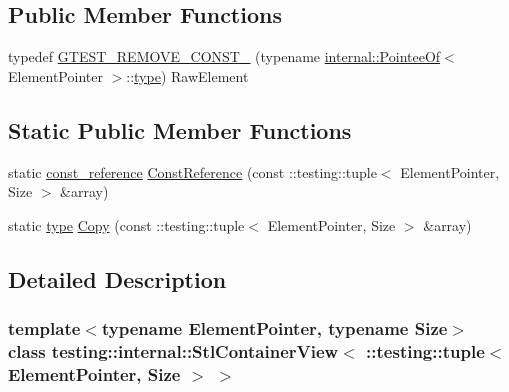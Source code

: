 \subsection*{Public Member Functions}
\begin{DoxyCompactItemize}
\item 
typedef \hyperlink{classtesting_1_1internal_1_1StlContainerView_3_01_1_1testing_1_1tuple_3_01ElementPointer_00_01Size_01_4_01_4_a2b1dd06842cb431ef647b85707ce52ff}{G\+T\+E\+S\+T\+\_\+\+R\+E\+M\+O\+V\+E\+\_\+\+C\+O\+N\+S\+T\+\_\+} (typename \hyperlink{structtesting_1_1internal_1_1PointeeOf}{internal\+::\+Pointee\+Of}$<$ Element\+Pointer $>$\+::\hyperlink{classtesting_1_1internal_1_1StlContainerView_3_01_1_1testing_1_1tuple_3_01ElementPointer_00_01Size_01_4_01_4_aedefb897170f76518afbca6f87b5467c}{type}) Raw\+Element
\end{DoxyCompactItemize}
\subsection*{Static Public Member Functions}
\begin{DoxyCompactItemize}
\item 
static \hyperlink{classtesting_1_1internal_1_1StlContainerView_3_01_1_1testing_1_1tuple_3_01ElementPointer_00_01Size_01_4_01_4_a4c69a4e22173b0e6f3eb55636d6a38f1}{const\+\_\+reference} \hyperlink{classtesting_1_1internal_1_1StlContainerView_3_01_1_1testing_1_1tuple_3_01ElementPointer_00_01Size_01_4_01_4_aba9be6fade312dd735ac47a3cb8cc355}{Const\+Reference} (const \+::testing\+::tuple$<$ Element\+Pointer, Size $>$ \&array)
\item 
static \hyperlink{classtesting_1_1internal_1_1StlContainerView_3_01_1_1testing_1_1tuple_3_01ElementPointer_00_01Size_01_4_01_4_aedefb897170f76518afbca6f87b5467c}{type} \hyperlink{classtesting_1_1internal_1_1StlContainerView_3_01_1_1testing_1_1tuple_3_01ElementPointer_00_01Size_01_4_01_4_a3d42db21a2f88d407a4b5acbb7fe252c}{Copy} (const \+::testing\+::tuple$<$ Element\+Pointer, Size $>$ \&array)
\end{DoxyCompactItemize}


\subsection{Detailed Description}
\subsubsection*{template$<$typename Element\+Pointer, typename Size$>$\newline
class testing\+::internal\+::\+Stl\+Container\+View$<$ \+::testing\+::tuple$<$ Element\+Pointer, Size $>$ $>$}



